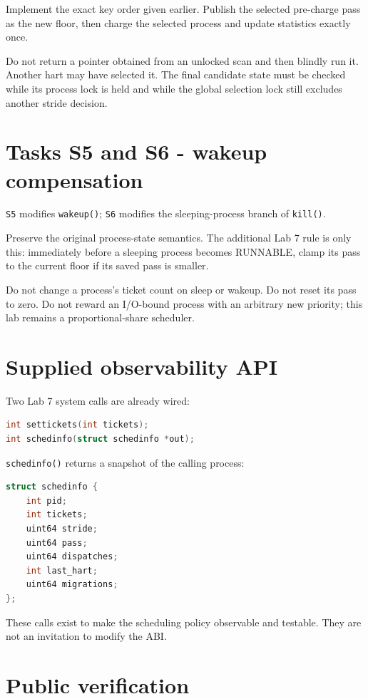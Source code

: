 \documentclass[11pt,a4paper]{article}
\newcommand{\file}[1]{\texttt{#1}}
\begin{document}
Implement the exact key order given earlier. Publish the selected pre-charge pass as the new floor, then charge the selected process and update statistics exactly once.

Do not return a pointer obtained from an unlocked scan and then blindly run it. Another hart may have selected it. The final candidate state must be checked while its process lock is held and while the global selection lock still excludes another stride decision.

\section{Tasks S5 and S6 - wakeup compensation}

\file{S5} modifies \file{wakeup()}; \file{S6} modifies the sleeping-process branch of \file{kill()}.

Preserve the original process-state semantics. The additional Lab 7 rule is only this: immediately before a sleeping process becomes RUNNABLE, clamp its pass to the current floor if its saved pass is smaller.

Do not change a process's ticket count on sleep or wakeup. Do not reset its pass to zero. Do not reward an I/O-bound process with an arbitrary new priority; this lab remains a proportional-share scheduler.

\section{Supplied observability API}

Two Lab 7 system calls are already wired:

\begin{lstlisting}[language=C]
int settickets(int tickets);
int schedinfo(struct schedinfo *out);
\end{lstlisting}

\file{schedinfo()} returns a snapshot of the calling process:

\begin{lstlisting}[language=C]
struct schedinfo {
    int pid;
    int tickets;
    uint64 stride;
    uint64 pass;
    uint64 dispatches;
    int last_hart;
    uint64 migrations;
};
\end{lstlisting}

These calls exist to make the scheduling policy observable and testable. They are not an invitation to modify the ABI.

\section{Public verification}
\end{document}
